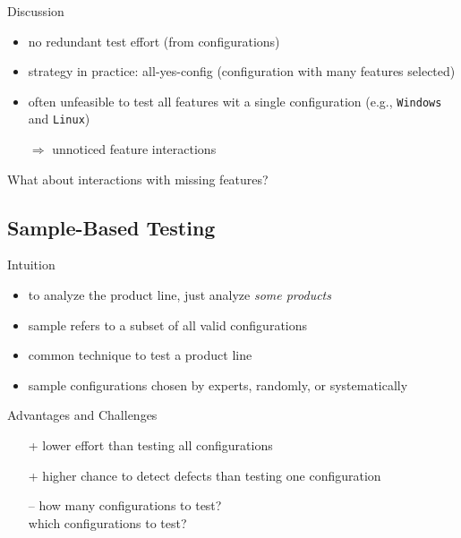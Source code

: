 \begin{frame}[b]{\myframetitle{}}
\begin{mycolumns}[b]
\begin{note}{Discussion}
\begin{itemize}
				\item no redundant test effort (from configurations)
				\item strategy in practice: all-yes-config (configuration with many features selected)
				\vspace*{1ex}
				\item often unfeasible to test all features wit a single configuration (e.g., \texttt{Windows} and \texttt{Linux})
				\item[$\Rightarrow$] unnoticed feature interactions\mysource{\lectureinteractions}
			\end{itemize}
		\end{note}
		\pause
		\begin{example}{What about interactions with missing features?}
			\centering{}
		\end{example}
	\end{mycolumns}
\end{frame}

\subsection{Sample-Based Testing}
\begin{frame}{\myframetitle{} }
	\begin{mycolumns}
		\begin{definition}{Intuition}
			\begin{itemize}
				\item to analyze the product line, just analyze \emph{some products}
				\item sample  refers to a subset of all valid configurations
				\item common technique to test a product line
				\item sample configurations chosen by experts, randomly, or systematically
			\end{itemize}
		\end{definition}
		\pause
		\begin{note}{Advantages and Challenges}
			\begin{itemize}
				\item[+] lower effort than testing all configurations
				\item[+] higher chance to detect defects than testing one configuration
				\item[--] how many configurations to test?\\which configurations to test?
			\end{itemize}
		\end{note}
	\mynextcolumn
		\pause
	\end{mycolumns}
\end{frame}

